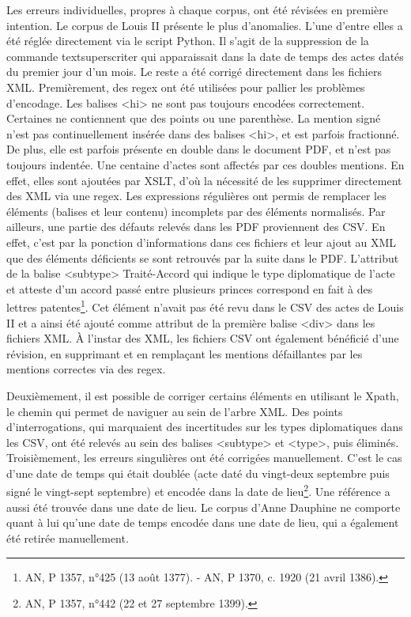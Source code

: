 \par Les erreurs individuelles, propres à chaque corpus, ont été révisées en première intention. Le corpus de Louis II présente le plus d'anomalies.
L'une d'entre elles a été réglée directement via le script Python. Il s'agit de la suppression de la commande \og textsuperscriter \fg \space qui apparaissait dans la date de temps des actes datés du premier jour d'un mois. Le reste a été corrigé directement dans les fichiers XML. Premièrement, des regex ont été utilisées pour pallier les problèmes d'encodage. Les balises <hi> ne sont pas toujours encodées correctement. Certaines ne contiennent que des points ou une parenthèse. La mention \og signé \fg \space n'est pas continuellement insérée dans des balises <hi>, et est parfois fractionné. De plus, elle est parfois présente en double dans le document PDF, et n'est pas toujours indentée. Une centaine d'actes sont affectés par ces doubles mentions. En effet, elles sont ajoutées par XSLT, d'où la nécessité de les supprimer directement des XML via une regex. Les expressions régulières ont permis de remplacer les éléments (balises et leur contenu) incomplets par des éléments normalisés. Par ailleurs, une partie des défauts relevés dans les PDF proviennent des CSV. En effet, c'est par la ponction d'informations dans ces fichiers et leur ajout au XML que des éléments déficients se sont retrouvés par la suite dans le PDF. L'attribut de la balise <subtype> \og Traité-Accord \fg \space qui indique le type diplomatique de l'acte et atteste d'un accord passé entre plusieurs princes correspond en fait à des lettres patentes\footnote{AN, P 1357, n°425 (13 août 1377). - AN, P 1370, c. 1920 (21 avril 1386).}. Cet élément n'avait pas été revu dans le CSV des actes de Louis II et a ainsi été ajouté comme attribut de la première balise <div> dans les fichiers XML. À l'instar des XML, les fichiers CSV ont également bénéficié d'une révision, en supprimant et en remplaçant les mentions défaillantes par les mentions correctes via des regex. 
\newpage 

\par Deuxièmement, il est possible de corriger certains éléments en utilisant le Xpath, le chemin qui permet de naviguer au sein de l'arbre XML. Des points d’interrogations, qui marquaient des incertitudes sur les types diplomatiques dans les CSV, ont été relevés au sein des balises <subtype> et <type>, puis éliminés. Troisièmement, les erreurs singulières ont été corrigées manuellement. C'est le cas d'une date de temps qui était doublée (acte daté du vingt-deux septembre puis signé le vingt-sept septembre) et encodée dans la date de lieu\footnote{AN, P 1357, n°442 (22 et 27 septembre 1399).}. Une référence a aussi été trouvée dans une date de lieu. Le corpus d'Anne Dauphine ne comporte quant à lui qu'une date de temps encodée dans une date de lieu, qui a également été retirée manuellement. 
\newline 

